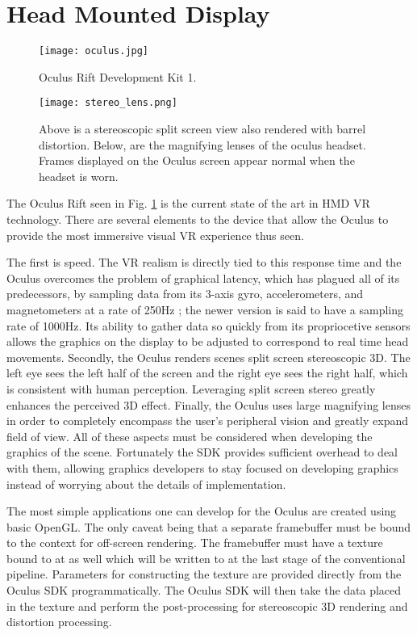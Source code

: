 \section{Head Mounted Display}
\label{sec:hmd}

\begin{figure}[]
\centering
\texttt{[image: oculus.jpg]}
\caption{Oculus Rift Development Kit 1. 
\cite{website:pcworld}}
\label{fig:oculus}
\end{figure}

\begin{figure}[]
\centering
\texttt{[image: stereo\_lens.png]}
\caption{Above is a stereoscopic split screen view also rendered with barrel distortion.
    Below, are the magnifying lenses of the oculus headset.
Frames displayed on the Oculus screen appear normal when the headset is worn.}
\label{fig:stereo}
\end{figure}


The Oculus Rift seen in Fig. \ref{fig:oculus} is the current state of the art
in HMD VR technology. There are several elements to the device that allow the
Oculus to provide the most immersive visual VR experience thus seen.

The first is speed.  The VR realism is directly tied to this response time and
the Oculus overcomes the problem of graphical latency, which has plagued all of
its predecessors, by sampling data from its 3-axis gyro, accelerometers, and
magnetometers at a rate of 250Hz \cite{website:roadtovr}; the newer version is
said to have a sampling rate of 1000Hz. Its ability to gather data so quickly
from its propriocetive sensors allows the graphics on the display to be
adjusted to correspond to real time head movements. Secondly, the Oculus
renders scenes split screen stereoscopic 3D. The left eye sees the left half of
the screen and the right eye sees the right half, which is consistent with
human perception. Leveraging split screen stereo greatly enhances the perceived
3D effect. Finally, the Oculus uses large magnifying lenses in order to
completely encompass the user's peripheral vision and greatly expand field of
view. All of these aspects must be considered when developing the graphics of
the scene. Fortunately the SDK provides sufficient overhead to deal with them,
allowing graphics developers to stay focused on developing graphics instead of
worrying about the details of implementation.

The most simple applications one can develop for the Oculus are created using
basic OpenGL. The only caveat being that a separate framebuffer must be bound
to the context for off-screen rendering. The framebuffer must have a texture
bound to at as well which will be written to at the last stage of the
conventional pipeline. Parameters for constructing the texture are provided
directly from the Oculus SDK programmatically. The Oculus SDK will then take the
data placed in the texture and perform the post-processing for stereoscopic 3D
rendering and distortion processing. 

